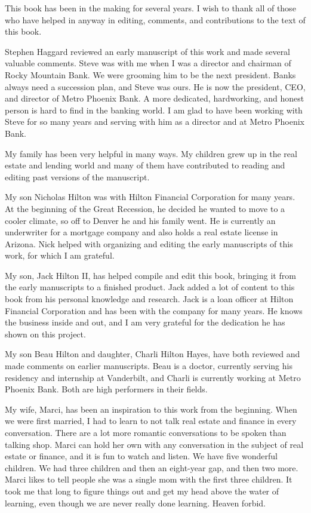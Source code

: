 \documentclass[
]{book}
\begin{document}
This book has been in the making for several years. I wish to thank all of those who have helped in anyway in editing, comments, and contributions to the text of this book.

Stephen Haggard reviewed an early manuscript of this work and made several valuable comments. Steve was with me when I was a director and chairman of Rocky Mountain Bank. We were grooming him to be the next president. Banks always need a succession plan, and Steve was ours. He is now the president, CEO, and director of Metro Phoenix Bank. A more dedicated, hardworking, and honest person is hard to find in the banking world. I am glad to have been working with Steve for so many years and serving with him as a director and at Metro Phoenix Bank.

My family has been very helpful in many ways. My children grew up in the real estate and lending world and many of them have contributed to reading and editing past versions of the manuscript.

My son Nicholas Hilton was with Hilton Financial Corporation for many years. At the beginning of the Great Recession, he decided he wanted to move to a cooler climate, so off to Denver he and his family went. He is currently an underwriter for a mortgage company and also holds a real estate license in Arizona. Nick helped with organizing and editing the early manuscripts of this work, for which I am grateful.

My son, Jack Hilton II, has helped compile and edit this book, bringing it from the early manuscripts to a finished product. Jack added a lot of content to this book from his personal knowledge and research. Jack is a loan officer at Hilton Financial Corporation and has been with the company for many years. He knows the business inside and out, and I am very grateful for the dedication he has shown on this project.

My son Beau Hilton and daughter, Charli Hilton Hayes, have both reviewed and made comments on earlier manuscripts. Beau is a doctor, currently serving his residency and internship at Vanderbilt, and Charli is currently working at Metro Phoenix Bank. Both are high performers in their fields.

My wife, Marci, has been an inspiration to this work from the beginning. When we were first married, I had to learn to not talk real estate and finance in every conversation. There are a lot more romantic conversations to be spoken than talking shop. Marci can hold her own with any conversation in the subject of real estate or finance, and it is fun to watch and listen. We have five wonderful children. We had three children and then an eight-year gap, and then two more. Marci likes to tell people she was a single mom with the first three children. It took me that long to figure things out and get my head above the water of learning, even though we are never really done learning. Heaven forbid.
\end{document}

